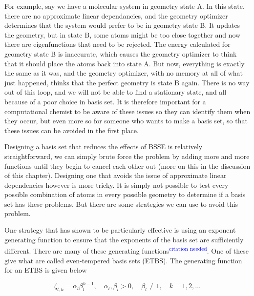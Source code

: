 \documentclass[12pt]{report}
\newcommand{\citethis}{\textsuperscript{\textcolor{blue}{citation needed}}} %
\begin{document}
For example, say we have a molecular system in geometry state A. In this state, there are no approximate linear dependancies, and the geometry optimizer determines that the system would prefer to be in geometry state B. It updates the geometry, but in state B, some atoms might be too close together and now there are eigenfunctions that need to be rejected. The energy calculated for geometry state B is inaccurate, which causes the geometry optimizer to think that it should place the atoms back into state A. But now, everything is exactly the same as it was, and the geometry optimizer, with no memory at all of what just happened, thinks that the perfect geometry is state B again. There is no way out of this loop, and we will not be able to find a stationary state, and all because of a poor choice in basis set. It is therefore important for a computational chemist to be aware of these issues so they can identify them when they occur, but even more so for someone who wants to make a basis set, so that these issues can be avoided in the first place.

Designing a basis set that reduces the effects of BSSE is relatively straightforward, we can simply brute force the problem by adding more and more functions until they begin to cancel each other out (more on this in the discussion of this chapter). Designing one that avoids the issue of approximate linear dependencies however is more tricky. It is simply not possible to test every possible combination of atoms in every possible geometry to determine if a basis set has these problems. But there are some strategies we can use to avoid this problem.

One strategy that has shown to be particularly effective is using an exponent generating function to ensure that the exponents of the basis set are sufficiently different. There are many of these generating functions\citethis. One of these give what are called even-tempered basis sets (ETBS). The generating function for an ETBS is given below

\begin{equation}
\label{eq:ETBS_gen}
\zeta_{l,k} = \alpha_{l}\beta^{k-1}_{l}, \quad \alpha_{l}, \beta_{l} > 0, \quad \beta_{l} \neq 1, \quad k = 1, 2, \ldots
\end{equation}
\end{document}
